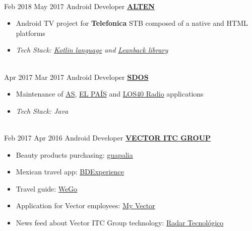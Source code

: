 \documentclass[letterpaper]{twentysecondcv} %
\begin{document}
\begin{twenty}
{\begin{itemize}
        \end{itemize}}
        \\
\twentyitem
    	{Feb 2018}
		{May 2017}
        {Android Developer}
        {\href{http://www.alten.es/}{\textbf{ALTEN}}}
        {}
        {\begin{itemize}
        \item Android TV project for \textbf{Telefonica} STB composed of a native and HTML platforms
        \item \textit{Tech Stack: \href{https://developer.android.com/kotlin/index.html}{Kotlin language} and \href{https://developer.android.com/tv/index.html}{Leanback library}}
        \end{itemize}}
        \\
	\twentyitem
    	{Apr 2017}
		{Mar 2017}
        {Android Developer}
        {\href{http://sdos.es/}{\textbf{SDOS}}}
        {}
        {
        {\begin{itemize}
        \item Maintenance of \href{https://play.google.com/store/apps/details?id=es.mmip.prisacom.as}{AS}, \href{https://play.google.com/store/apps/details?id=com.elpais.elpais}{EL PAÍS} and \href{https://play.google.com/store/apps/details?id=com.prisaradio.replicapp.loscuarenta}{LOS40 Radio} applications
        \item \textit{Tech Stack: Java} 
    \end{itemize}}
        }
    \\   
    \twentyitem
   		{Feb 2017}
		{Apr 2016}
        {Android Developer}
        {\href{http://www.vectoritcgroup.com/es/home/global}{\textbf{VECTOR ITC GROUP}}}
        {}
        {
        {\begin{itemize}
        \item Beauty products purchasing: \href{https://play.google.com/store/apps/details?id=com.guapalia&hl=es}{guapalia}
        \item Mexican travel app: \href{https://play.google.com/store/apps/details?id=com.bdtravel.re_appbdtravelandroid&hl=es}{BDExperience}
        \item Travel guide: \href{https://play.google.com/store/apps/details?id=com.wego.bcn&hl=es}{WeGo}
        \item Application for Vector employees:
		\href{https://play.google.com/store/apps/details?id=com.vectormobile.myvector&hl=es}{My Vector}
		\item News feed about Vector ITC Group technology:
		\href{https://play.google.com/store/apps/details?id=com.vectormobile.trends&hl=es}{Radar Tecnológico}

\end{itemize}}}
\end{twenty}
\end{document}
